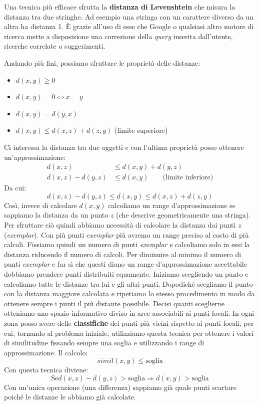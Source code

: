 			Una tecnica più efficace sfrutta la \textbf{distanza di Levenshtein} che misura la distanza tra due stringhe. Ad esempio una stringa con un carattere diverso da un altra ha distanza 1. È grazie all'uso di esse che Google o qualsiasi altro motore di ricerca mette a disposizione una correzione della \emph{query} inserita dall'utente, ricerche correlate o suggerimenti.
			
			Andando più fini, possiamo sfruttare le proprietà delle distanze:
			\begin{itemize}
				\item $d(x,y)\ge 0$
				\item $d(x,y)=0 \Leftrightarrow x=y$
				\item $d(x,y)=d(y,x)$
				\item $d(x,y) \le d(x,z)+d(z,y)$ (limite superiore)
			\end{itemize}
			Ci interessa la distanza tra due oggetti e con l'ultima proprietà posso ottenere un'approssimazione:
			\begin{align}
				d(x,z) &\le d(x,y)+d(y,z) \\
				d(x,z)-d(y,z) &\le d(x,y) \quad \quad \text{(limite inferiore)}
			\end{align}
			Da cui:
			\[
				d(x,z)-d(y,z) \le d(x,y) \le d(x,z) + d(z,y)
			\]
			Così, invece di calcolare $d(x,y)$ calcoliamo un range d'approssimazione se sappiamo la distanza da un punto $z$ (che descrive geometricamente una stringa). Per sfruttare ciò quindi abbiamo necessità di calcolare la distanza dai punti $z$ (\emph{exemplar}). Con più punti \emph{exemplar} più avremo un range preciso al costo di più calcoli. Fissiamo quindi un numero di punti \emph{exemplar} e calcoliamo solo in essi la distanza riducendo il numero di calcoli.
			Per diminuire al minimo il numero di punti \emph{exemplar} e far sì che questi diano un range d'approssimazione accettabile dobbiamo prendere punti distribuiti equamente. 
			Iniziamo scegliendo un punto e calcoliamo tutte le distanze tra lui e gli altri punti. Dopodiché scegliamo il punto con la distanza maggiore calcolata e ripetiamo lo stesso procedimento in modo da ottenere sempre i punti il più distante possibile.
			Decisi quanti sceglierne otteniamo uno spazio informativo diviso in aree associabili ai punti focali. In ogni zona posso avere delle \textbf{classifiche} dei punti più vicini rispetto ai punti focali, per cui, tornando al problema iniziale, utilizziamo questa tecnica per ottenere i valori di similitudine fissando sempre una soglia e utilizzando i range di approssimazione. Il calcolo:
			\[
				simil(x,y) \le \text{soglia}
			\]
			Con questa tecnica diviene:
			\[
				\text{Se} d(x,z) - d(y,z) > \text{soglia} \Rightarrow d(x,y)>\text{soglia}
			\]
			Con un'unica operazione (una differenza) sappiamo già quale punti scartare poiché le distanze le abbiamo già calcolate.
			
